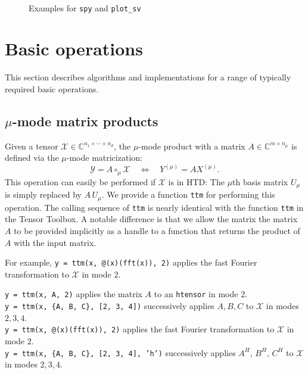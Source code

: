 \documentclass[11pt, a4paper]{article}
\newcommand{\calX}{\mathcal{X}}
\newcommand{\calY}{\mathcal{Y}}
\newcommand{\C}{{\mathbb C}}
\begin{document}
\begin{preprint}
 \begin{figure}
  \begin{center}
    \begin{minipage}{0.4\textwidth}
      \begin{center}
      \end{center}
    \end{minipage}$\qquad$
    \begin{minipage}{0.4\textwidth}
    \end{minipage}
  \end{center}
  \caption{Examples for \texttt{spy} and \texttt{plot\_sv}} \label{fig:spyplots}
\end{figure}
\end{preprint}

\section{Basic operations} \label{sec:basicops}

This section describes algorithms and implementations for a range of typically required basic operations.

\subsection{$\mu$-mode matrix products}

Given a tensor $\calX \in \C^{n_1\times \cdots \times n_d}$, the $\mu$-mode product
with a matrix $A \in \C^{m\times n_\mu}$ is defined via the $\mu$-mode matricization:
\[
 \calY = A \circ_{\mu} \calX \quad \Leftrightarrow \quad Y^{(\mu)} = A X^{(\mu)}.
\]
This operation can easily be performed if $\calX$ is in HTD: The $\mu$th basis matrix
$U_\mu$ is simply replaced by $A\,U_\mu$. We provide a function {\tt ttm} for performing
this operation. The calling sequence of {\tt ttm} is nearly identical with the function {\tt ttm} in the Tensor Toolbox. A notable difference is that we allow the matrix
the matrix $A$ to be provided implicitly as a 
handle to a function that returns the product of $A$ with the input matrix.
\begin{submitted}
For example, \texttt{y = ttm(x, @(x)(fft(x)), 2)} 
applies the fast Fourier transformation to $\calX$ in mode $2$.
\end{submitted}
\begin{preprint}
\begin{framed}
\noindent \texttt{y = ttm(x, A, 2)} applies the matrix $A$ to an \texttt{htensor} in mode $2$.\\
\texttt{y = ttm(x, \{A, B, C\}, [2, 3, 4])} successively applies $A, B, C$ to $\calX$ in modes $2, 3, 4$.\\
\texttt{y = ttm(x, @(x)(fft(x)), 2)} applies the fast Fourier transformation to $\calX$ in mode $2$.\\
\texttt{y = ttm(x, \{A, B, C\}, [2, 3, 4], 'h')} successively applies $A^H$, $B^H$, $C^H$ to $\calX$ in modes $2, 3, 4$.
\end{framed}
\end{preprint}
\end{document}
